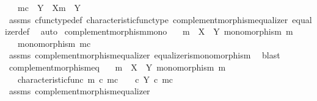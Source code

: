 \begin{isabellebody}
\ \ \ {\isachardoublequoteopen}m\isactrlsup c\ {\isacharcolon}{\kern0pt}\ Y\ {\isasymsetminus}\ {\isacharparenleft}{\kern0pt}X{\isacharcomma}{\kern0pt}m{\isacharparenright}{\kern0pt}\ {\isasymrightarrow}\ Y{\isachardoublequoteclose}\isanewline
%
\isadelimproof
\ \ %
\endisadelimproof
%
\isatagproof
{}\isamarkupfalse%
\ assms\ cfunc{\isacharunderscore}{\kern0pt}type{\isacharunderscore}{\kern0pt}def\ characteristic{\isacharunderscore}{\kern0pt}func{\isacharunderscore}{\kern0pt}type\ complement{\isacharunderscore}{\kern0pt}morphism{\isacharunderscore}{\kern0pt}equalizer\ equalizer{\isacharunderscore}{\kern0pt}def\ \isamarkupfalse%
\ auto%
\endisatagproof
{\isafoldproof}%
%
\isadelimproof
\isanewline
%
\endisadelimproof
\isanewline
{}\isamarkupfalse%
\ complement{\isacharunderscore}{\kern0pt}morphism{\isacharunderscore}{\kern0pt}mono{\isacharcolon}{\kern0pt}\isanewline
\ \ \ {\isachardoublequoteopen}m\ {\isacharcolon}{\kern0pt}\ X\ {\isasymrightarrow}\ Y{\isachardoublequoteclose}\ {\isachardoublequoteopen}monomorphism\ m{\isachardoublequoteclose}\isanewline
\ \ \ {\isachardoublequoteopen}monomorphism\ m\isactrlsup c{\isachardoublequoteclose}\isanewline
%
\isadelimproof
\ \ %
\endisadelimproof
%
\isatagproof
{}\isamarkupfalse%
\ assms\ complement{\isacharunderscore}{\kern0pt}morphism{\isacharunderscore}{\kern0pt}equalizer\ equalizer{\isacharunderscore}{\kern0pt}is{\isacharunderscore}{\kern0pt}monomorphism\ \isamarkupfalse%
\ blast%
\endisatagproof
{\isafoldproof}%
%
\isadelimproof
\isanewline
%
\endisadelimproof
\isanewline
{}\isamarkupfalse%
\ complement{\isacharunderscore}{\kern0pt}morphism{\isacharunderscore}{\kern0pt}eq{\isacharcolon}{\kern0pt}\isanewline
\ \ \ {\isachardoublequoteopen}m\ {\isacharcolon}{\kern0pt}\ X\ {\isasymrightarrow}\ Y{\isachardoublequoteclose}\ {\isachardoublequoteopen}monomorphism\ m{\isachardoublequoteclose}\isanewline
\ \ \ {\isachardoublequoteopen}characteristic{\isacharunderscore}{\kern0pt}func\ m\ {\isasymcirc}\isactrlsub c\ m\isactrlsup c\ \ {\isacharequal}{\kern0pt}\ {\isacharparenleft}{\kern0pt}{\isasymf}\ {\isasymcirc}\isactrlsub c\ {\isasymbeta}\isactrlbsub Y\isactrlesub {\isacharparenright}{\kern0pt}\ {\isasymcirc}\isactrlsub c\ m\isactrlsup c{\isachardoublequoteclose}\isanewline
%
\isadelimproof
\ \ %
\endisadelimproof
%
\isatagproof
{}\isamarkupfalse%
\ assms\ complement{\isacharunderscore}{\kern0pt}morphism{\isacharunderscore}{\kern0pt}equalizer\ \isamarkupfalse%

\end{isabellebody}
